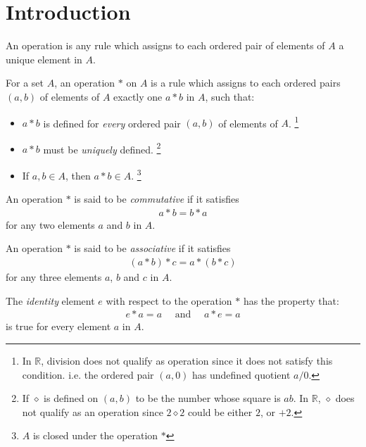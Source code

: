 \section{Introduction}

\begin{defns}
    An operation is any rule which assigns to each ordered pair of elements of $A$ a unique element in $A$.
\end{defns}

\begin{defns}
	For a set $A$, an operation $*$ on $A$ is a rule which assigns to each ordered pairs $(a,b)$ of elements of $A$ exactly one $a * b$ in $A$, such that:
    \begin{itemize}
        \item $a * b$ is defined for \emph{every} ordered pair $(a,b)$ of elements of $A$. \footnote{In $\mathbb{R}$, division does not qualify as operation since it does not satisfy this condition. i.e. the ordered pair $(a, 0)$ has undefined quotient $a / 0$.}
        \item $a * b$ must be \emph{uniquely} defined. \footnote{If $\diamond$ is defined on $(a, b)$ to be the number whose square is $ab$. In $\mathbb{R}$, $\diamond$ does not qualify as an operation since $2 \diamond 2$  could be either $2$, or $+2$.}
        \item If $a, b \in A$, then $a * b \in A$. \footnote{$A$ is closed under the operation $*$}
    \end{itemize}
\end{defns}

    
\begin{defns}[Commutativity]
    An operation $*$ is said to be \emph{commutative} if it satisfies
    \begin{align}
        a * b  = b * a
    \end{align}
    for any two elements $a$ and $b$ in $A$.
\end{defns}

\begin{defns}[Associativity]
    An operation $*$ is said to be \emph{associative} if it satisfies 
        \begin{align}
            (a * b) * c = a * (b * c)
        \end{align}
        for any three elements $a$, $b$ and $c$ in $A$.
\end{defns}

\begin{defns}
    The \emph{identity} element $e$ with respect to the operation $*$ has the property that:
        \begin{align}
            e * a  = a \quad\text{ and }\quad a * e = a
        \end{align}
        is true for every element $a$ in $A$.
\end{defns}

